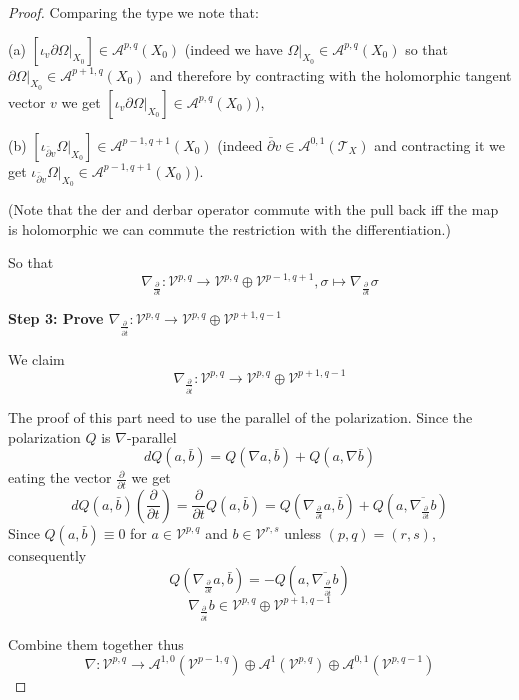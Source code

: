 \documentclass[11pt]{article}
\theoremstyle{definition}
\begin{document}
\begin{proof}
	
	Comparing the type we note that:
	
	(a) $[\iota_v  \partial \Omega|_{X_0}] \in \mathcal{A}^{p,q}(X_0)$ (indeed we have $\Omega |_{X_0}\in \mathcal{A}^{p,q}(X_0)$ so that $\partial \Omega|_{X_0} \in \mathcal{A}^{p+1,q}(X_0)$ and therefore by contracting with the holomorphic tangent vector $v$ we get $[\iota_v \partial \Omega|_{X_0}] \in \mathcal{A}^{p,q}(X_0)$),
	
	(b) $[\iota_{\bar{\partial} v} \Omega|_{X_0}]\in \mathcal{A}^{p-1,q+1}(X_0)$ (indeed $\bar{\partial} v \in \mathcal{A}^{0,1}(\mathcal{T}_X)$ and contracting it we get $\iota_{\bar{\partial} v}\Omega|_{X_0} \in \mathcal{A}^{p-1,q+1}(X_0)$). 
	
	(Note that the der and derbar operator commute with the pull back iff the map is holomorphic we can commute the restriction with the differentiation.)
	
	So that $$\nabla _{\frac{\partial }{\partial  t}}: \mathcal{V}^{p,q}\to \mathcal{V}^{p,q}\oplus \mathcal{V}^{p-1,q+1}, \sigma  \mapsto  \nabla_{\frac{\partial }{\partial t}} \sigma$$
	
	
	\textbf{Step 3: Prove $\nabla_{\frac{\partial }{{\partial} \bar{t}}}:\mathcal{V}^{p,q}\to {\mathcal{V}^{p,q}\oplus \mathcal{V}^{p+1,q-1}}$}
	
	We claim
	$$\nabla_{\frac{\partial }{{\partial} \bar{t}}}:\mathcal{V}^{p,q}\to {\mathcal{V}^{p,q}\oplus \mathcal{V}^{p+1,q-1}}$$
	
	The proof of this part need to use the parallel of the polarization. Since the polarization $Q$ is $\nabla$-parallel $$dQ(a,\bar{b}) =  Q(\nabla  a ,\bar{b}) + Q(a,\nabla \bar{b})$$
	eating the vector $\frac{\partial }{\partial t}$ we get $$ dQ(a,\bar{b}) (\frac{\partial }{\partial t}) = \frac{\partial }{\partial t} Q(a,\bar{b})  =  Q(\nabla_{\frac{\partial }{\partial t}} a  ,\bar{b}) + Q(a,\overline{ \nabla_{\frac{\partial }{\partial t}} b})  $$
	Since $Q(a,\bar{b}) \equiv 0$ for $a \in \mathcal{V}^{p,q}$ and $b \in \mathcal{V}^{r,s}$ unless $(p,q) = (r,s)$, consequently $$ Q\left(\nabla _{\frac{\partial }{\partial t }}a,\bar{b}\right) =  -Q(a, \overline{\nabla _{\frac{\partial }{\partial \bar{t}}}b})$$
	$$\nabla_{\frac{\partial }{\partial \overline{t}}}b \in \mathcal{V}^{p,q}\oplus { \mathcal{V}^{p+1,q-1}}$$
	
	Combine them together thus
	$$\nabla : \mathcal{V}^{p,q}\to \mathcal{A}^{1,0}(\mathcal{V}^{p-1,q})\oplus \mathcal{A}^{1}(\mathcal{V}^{p,q})\oplus \mathcal{A}^{0,1}(\mathcal{V}^{p,q-1})$$
	
	\end{proof}
\end{document}
